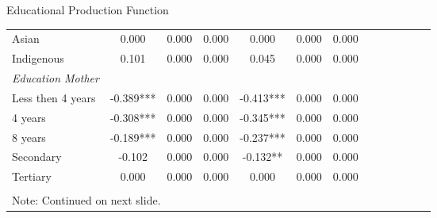 \documentclass{beamer}
\begin{document}
\begin{frame}[label=EPF]{Educational Production Function}
\begin{table}
\begin{adjustbox}{max width=\textwidth}
\begin{tabular}{l*{6}{cc}}
Asian               &       0.000   &       0.000   &       0.000   &       0.000   &       0.000   &       0.000   \\
Indigenous          &       0.101   &       0.000   &       0.000   &       0.045   &       0.000   &       0.000   \\
\emph{Education Mother}&               &               &               &               &               &               \\
Less then 4 years   &      -0.389***&       0.000   &       0.000   &      -0.413***&       0.000   &       0.000   \\
4 years             &      -0.308***&       0.000   &       0.000   &      -0.345***&       0.000   &       0.000   \\
8 years             &      -0.189***&       0.000   &       0.000   &      -0.237***&       0.000   &       0.000   \\
Secondary           &      -0.102   &       0.000   &       0.000   &      -0.132** &       0.000   &       0.000   \\
Tertiary            &       0.000   &       0.000   &       0.000   &       0.000   &       0.000   &       0.000   \vspace{-3pt}\\
\bottomrule
\vspace{-18pt} \\
\multicolumn{7}{l}{\tiny Note: Continued on next slide.}\\
\end{tabular}
\end{adjustbox}
\end{table}
\end{frame} 
\end{document}
